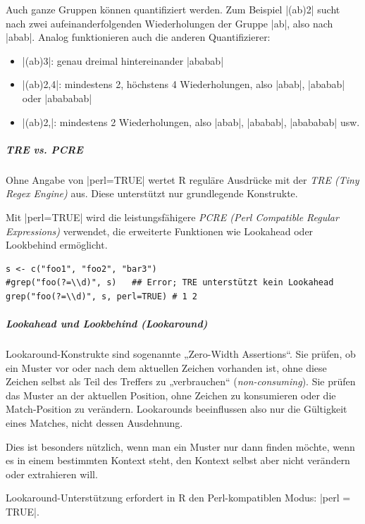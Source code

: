 \documentclass[10pt,twocolumn]{scrartcl}
\renewcommand{\lstinline}{\mycoloredinline}
\begin{document}
Auch ganze Gruppen können quantifiziert werden. Zum Beispiel
\lstinline|(ab){2}| sucht nach zwei aufeinanderfolgenden Wiederholungen der Gruppe \lstinline|ab|, also nach \lstinline|abab|. 
Analog funktionieren auch die anderen Quantifizierer:

\begin{itemize}
  \item \lstinline|(ab){3}|: genau dreimal hintereinander \lstinline|ababab|
  \item \lstinline|(ab){2,4}|: mindestens 2, höchstens 4 Wiederholungen, also \lstinline|abab|, \lstinline|ababab| oder \lstinline|abababab|
  \item \lstinline|(ab){2,}|: mindestens 2 Wiederholungen, also \lstinline|abab|, \lstinline|ababab|, \lstinline|abababab| usw.
\end{itemize}

\subparagraph{TRE vs. PCRE}

Ohne Angabe von \lstinline|perl=TRUE| wertet R reguläre Ausdrücke mit der \emph{TRE (Tiny Regex Engine)} aus. Diese unterstützt nur grundlegende Konstrukte.

Mit \lstinline|perl=TRUE| wird die leistungsfähigere \emph{PCRE (Perl Compatible Regular Expressions)} verwendet, die erweiterte Funktionen wie Lookahead oder Lookbehind ermöglicht.

\begin{lstlisting}
s <- c("foo1", "foo2", "bar3")
#grep("foo(?=\\d)", s)   ## Error; TRE unterstützt kein Lookahead
grep("foo(?=\\d)", s, perl=TRUE) # 1 2
\end{lstlisting}

\subparagraph{Lookahead und Lookbehind (Lookaround)}

Lookaround-Konstrukte sind sogenannte „Zero-Width Assertions“. Sie prüfen, ob ein Muster vor oder nach dem aktuellen Zeichen vorhanden ist, ohne diese Zeichen selbst als Teil des Treffers zu „verbrauchen“ (\emph{non-consuming}). Sie prüfen das Muster an der aktuellen Position, ohne Zeichen zu konsumieren oder die Match-Position zu verändern. Lookarounds beeinflussen also nur die Gültigkeit eines Matches, nicht dessen Ausdehnung.

Dies ist besonders nützlich, wenn man ein Muster nur dann finden möchte, wenn es in einem bestimmten Kontext steht, den Kontext selbst aber nicht verändern oder extrahieren will.

Lookaround-Unterstützung erfordert in R den Perl-kompatiblen Modus: \lstinline|perl = TRUE|.
\end{document}

